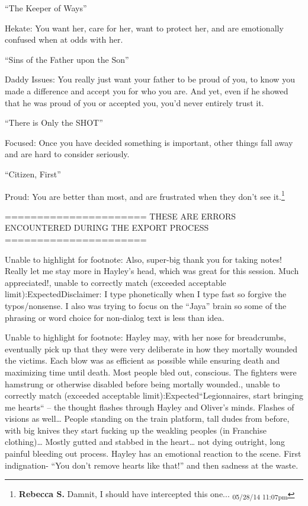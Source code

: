 
 ``The Keeper of Ways''

 Hekate: You want her, care for her, want to protect her, and are emotionally confused when at odds with her.



 ``Sins of the Father upon the Son''

 Daddy Issues: You really just want your father to be proud of you, to know you made a difference and accept you for who you are. And yet, even if he showed that he was proud of you or accepted you, you'd never entirely trust it.





 ``There is Only the SHOT''

 Focused: Once you have decided something is important, other things fall away and are hard to consider seriously.



 ``Citizen, First''

 Proud: You are better than most, and are frustrated when they don't see it.\footnote{\textbf{Rebecca S. }Damnit, I should have intercepted this one... \textsubscript{05/28/14 11:07pm}}










\iffalse

======================
THESE ARE ERRORS ENCOUNTERED DURING THE EXPORT PROCESS
======================

	Unable to highlight for footnote: Also, super-big thank you for taking notes!  Really let me stay more in Hayley's head, which was great for this session.  Much appreciated!, unable to correctly match (exceeded acceptable limit):ExpectedDisclaimer: I type phonetically when I type fast so forgive the typos/nonsense.  I also was trying to focus on the “Jaya” brain so some of the phrasing or word choice for non-dialog text is less than idea.

	Unable to highlight for footnote: Hayley may, with her nose for breadcrumbs, eventually pick up that they were very deliberate in how they mortally wounded the victims. Each blow was as efficient as possible while ensuring death and maximizing time until death. Most people bled out, conscious. The fighters were hamstrung or otherwise disabled before being mortally wounded., unable to correctly match (exceeded acceptable limit):Expected“Legionnaires, start bringing me hearts“ -- the thought flashes through Hayley and Oliver’s minds.  Flashes of visions as well… People standing on the train platform, tall dudes from before, with big knives they start fucking up the weakling peoples (in Franchise clothing)… Mostly gutted and stabbed in the heart… not dying outright, long painful bleeding out process.  
Hayley has an emotional reaction to the scene.  First indignation- “You don’t remove hearts like that!” and then sadness at the waste.


